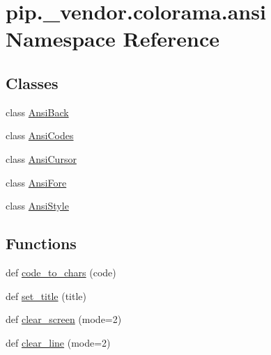 \hypertarget{namespacepip_1_1__vendor_1_1colorama_1_1ansi}{}\section{pip.\+\_\+vendor.\+colorama.\+ansi Namespace Reference}
\label{namespacepip_1_1__vendor_1_1colorama_1_1ansi}
\subsection*{Classes}
\begin{DoxyCompactItemize}
\item 
class \hyperlink{classpip_1_1__vendor_1_1colorama_1_1ansi_1_1AnsiBack}{Ansi\+Back}
\item 
class \hyperlink{classpip_1_1__vendor_1_1colorama_1_1ansi_1_1AnsiCodes}{Ansi\+Codes}
\item 
class \hyperlink{classpip_1_1__vendor_1_1colorama_1_1ansi_1_1AnsiCursor}{Ansi\+Cursor}
\item 
class \hyperlink{classpip_1_1__vendor_1_1colorama_1_1ansi_1_1AnsiFore}{Ansi\+Fore}
\item 
class \hyperlink{classpip_1_1__vendor_1_1colorama_1_1ansi_1_1AnsiStyle}{Ansi\+Style}
\end{DoxyCompactItemize}
\subsection*{Functions}
\begin{DoxyCompactItemize}
\item 
def \hyperlink{namespacepip_1_1__vendor_1_1colorama_1_1ansi_a00269b4e6c23e788159dd26458e4dd93}{code\+\_\+to\+\_\+chars} (code)
\item 
def \hyperlink{namespacepip_1_1__vendor_1_1colorama_1_1ansi_a7bdf6c3b8bcb1c00503d95305fc16674}{set\+\_\+title} (title)
\item 
def \hyperlink{namespacepip_1_1__vendor_1_1colorama_1_1ansi_a790e79db119d1c04afb53ce76e52ec52}{clear\+\_\+screen} (mode=2)
\item 
def \hyperlink{namespacepip_1_1__vendor_1_1colorama_1_1ansi_a90721da1b73ffa98fe65772be0434f8e}{clear\+\_\+line} (mode=2)
\end{DoxyCompactItemize}
